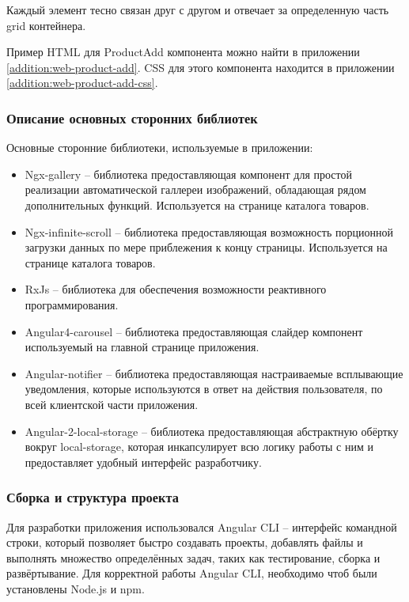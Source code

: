 Каждый элемент тесно связан друг с другом и отвечает за определенную часть grid контейнера.

Пример HTML для ProductAdd компонента можно найти в приложении \ref{addition:web-product-add}.
CSS для этого компонента находится в приложении \ref{addition:web-product-add-css}.

\subsubsection{Описание основных сторонних библиотек}\indent

Основные сторонние библиотеки, используемые в приложении:
\begin{itemize}
    \item Ngx-gallery – библиотека предоставляющая компонент для простой реализации автоматической галлереи изображений, обладающая рядом дополнительных функций.
    Используется на странице каталога товаров.
    \item Ngx-infinite-scroll – библиотека предоставляющая возможность порционной загрузки данных по мере приблежения к концу страницы.
    Используется на странице каталога товаров.
    \item RxJs – библиотека для обеспечения возможности реактивного программирования.
    \item Angular4-carousel – библиотека предоставляющая слайдер компонент используемый на главной странице приложения.
    \item Angular-notifier – библиотека предоставляющая настраиваемые всплывающие уведомления, которые используются в ответ на действия пользователя, по всей клиентской части приложения.
    \item Angular-2-local-storage – библиотека предоставляющая абстрактную обёртку вокруг local-storage, которая инкапсулирует всю логику работы с ним и предоставляет удобный интерфейс разработчику.
\end{itemize}

\subsubsection{Сборка и структура проекта}\indent

Для разработки приложения использовался Angular CLI – интерфейс командной строки, который позволяет быстро создавать проекты, добавлять файлы и выполнять множество определённых задач, таких как тестирование, сборка и развёртывание.
Для корректной работы Angular CLI, необходимо чтоб были установлены Node.js и npm.

